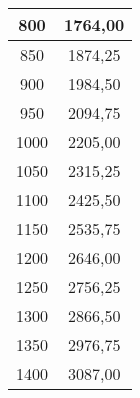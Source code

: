 \documentclass[10pt]{article}
\begin{document}
\begin{table}[!ht]
\begin{tabular}{|c|c|}
      800 & 1764,00 \\ \hline
      850 & 1874,25 \\ \hline
      900 & 1984,50 \\ \hline
      950 & 2094,75 \\ \hline
      1000 & 2205,00 \\ \hline
      1050 & 2315,25 \\ \hline
      1100 & 2425,50 \\ \hline
      1150 & 2535,75 \\ \hline
      1200 & 2646,00 \\ \hline
      1250 & 2756,25 \\ \hline
      1300 & 2866,50 \\ \hline
      1350 & 2976,75 \\ \hline
      1400 & 3087,00 \\ \hline
  \end{tabular}
\end{table}

\newpage
\end{document}
